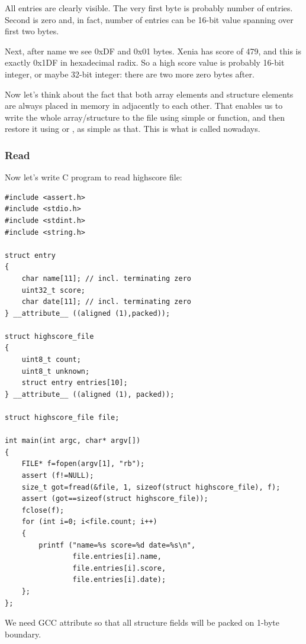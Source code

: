 All entries are clearly visible.
The very first byte is probably number of entries.
Second is zero and, in fact, number of entries can be 16-bit value spanning over first two bytes.

Next, after  name we see 0xDF and 0x01 bytes.
Xenia has score of 479, and this is exactly 0x1DF in hexadecimal radix.
So a high score value is probably 16-bit integer, or maybe 32-bit integer: there are two more zero bytes after.

Now let's think about the fact that both array elements and structure elements are always placed in memory in adjacently to each other.
That enables us to write the whole array/structure to the file using simple  or  function, 
and then restore it using  or , as simple as that.
This is what is called  nowadays.

\subsubsection{Read}

Now let's write C program to read highscore file:

\begin{lstlisting}[style=customc]
#include <assert.h>
#include <stdio.h>
#include <stdint.h>
#include <string.h>

struct entry
{
	char name[11]; // incl. terminating zero
	uint32_t score;
	char date[11]; // incl. terminating zero
} __attribute__ ((aligned (1),packed));

struct highscore_file
{
	uint8_t count;
	uint8_t unknown;
	struct entry entries[10];
} __attribute__ ((aligned (1), packed));

struct highscore_file file;

int main(int argc, char* argv[])
{
	FILE* f=fopen(argv[1], "rb");
	assert (f!=NULL);
	size_t got=fread(&file, 1, sizeof(struct highscore_file), f);
	assert (got==sizeof(struct highscore_file));
	fclose(f);
	for (int i=0; i<file.count; i++)
	{
		printf ("name=%s score=%d date=%s\n",
				file.entries[i].name,
				file.entries[i].score,
				file.entries[i].date);
	};
};
\end{lstlisting}

We need GCC  attribute so that all structure fields will be packed on 1-byte boundary.

